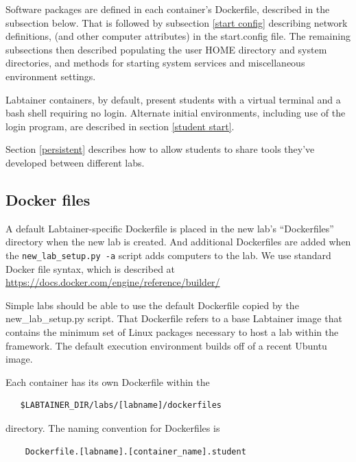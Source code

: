 \documentclass[12pt]{article}
\begin{document}
Software packages are defined in each container's Dockerfile, described in 
the subsection below. That is followed by subsection \ref{start config} describing network definitions,
(and other computer attributes) in the start.config file.  The remaining subsections then
described populating the user HOME directory and system directories, and methods for starting 
system services and miscellaneous environment settings. 

Labtainer containers, by default, present students with a virtual terminal and a bash
shell requiring no login.  Alternate initial environments, including use of the login program, are
described in section \ref{student start}.

Section \ref{persistent} describes how to
allow students to share tools they've developed between different labs.  

\subsection {Docker files}
A default Labtainer-specific Dockerfile is placed in the new lab's ``Dockerfiles'' 
directory when the new lab is created.  And additional Dockerfiles are added when the
{\tt new\_lab\_setup.py -a} script adds computers to the lab. We use standard Docker file syntax, which is described at 
\url{https://docs.docker.com/engine/reference/builder/}

Simple labs should be able to use the default Dockerfile copied by the 
new\_lab\_setup.py script.  That Dockerfile refers to a base Labtainer
image that contains the minimum set of Linux packages necessary to 
host a lab within the framework.  The default
execution environment builds off of a recent Ubuntu image.

\noindent Each container has its own Dockerfile within the 
\begin{verbatim}
   $LABTAINER_DIR/labs/[labname]/dockerfiles
\end{verbatim}
\noindent directory.  The naming convention for Dockerfiles is
\begin{verbatim}
    Dockerfile.[labname].[container_name].student
\end{verbatim}
\end{document}
